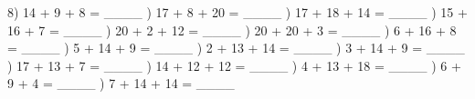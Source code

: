 \documentclass{article}%
\begin{document}
8) 14 + 9 + 8 = \_\_\_\_%
\newline%
\newline%
) 17 + 8 + 20 = \_\_\_\_%
\newline%
\newline%
) 17 + 18 + 14 = \_\_\_\_%
\newline%
\newline%
) 15 + 16 + 7 = \_\_\_\_%
\newline%
\newline%
) 20 + 2 + 12 = \_\_\_\_%
\newline%
\newline%
) 20 + 20 + 3 = \_\_\_\_%
\newline%
\newline%
) 6 + 16 + 8 = \_\_\_\_%
\newline%
\newline%
) 5 + 14 + 9 = \_\_\_\_%
\newline%
\newline%
) 2 + 13 + 14 = \_\_\_\_%
\newline%
\newline%
) 3 + 14 + 9 = \_\_\_\_%
\newline%
\newline%
) 17 + 13 + 7 = \_\_\_\_%
\newline%
\newline%
) 14 + 12 + 12 = \_\_\_\_%
\newline%
\newline%
) 4 + 13 + 18 = \_\_\_\_%
\newline%
\newline%
) 6 + 9 + 4 = \_\_\_\_%
\newline%
\newline%
) 7 + 14 + 14 = \_\_\_\_%
\newline%
\newline%
\end{document}
